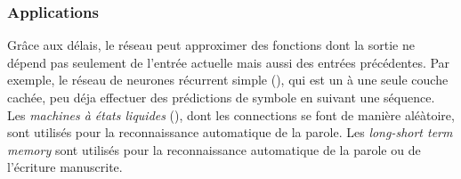 \subsubsection*{Applications}
Grâce aux délais, le réseau peut approximer des fonctions dont la sortie ne dépend pas seulement de l'entrée actuelle mais aussi des entrées précédentes.
Par exemple, le réseau de neurones récurrent simple (\srn), qui est un \rmlp à une seule couche cachée, peu déja effectuer des prédictions de symbole en suivant une séquence.
Les \emph{machines à états liquides} (\lsm), dont les connections se font de manière aléàtoire, sont utilisés pour la reconnaissance automatique de la parole. %
Les \emph{long-short term memory} sont utilisés pour la reconnaissance automatique de la parole ou de l'écriture manuscrite. %